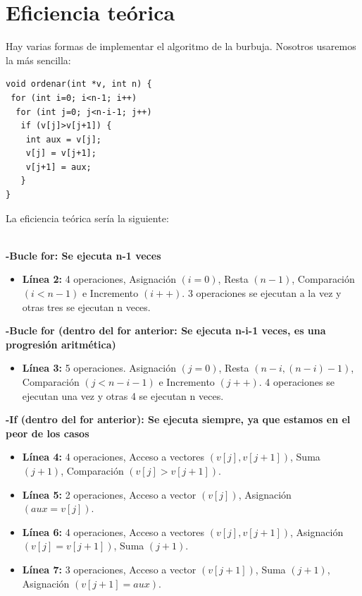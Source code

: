 \documentclass[a4paper,11pt]{article}
\begin{document}
\section{Eficiencia teórica}
Hay varias formas de implementar el algoritmo de la burbuja. Nosotros usaremos la más sencilla:
\lstset{language=C, breaklines=true, basicstyle=\footnotesize}
\begin{lstlisting}[frame=single]
void ordenar(int *v, int n) {
 for (int i=0; i<n-1; i++)
  for (int j=0; j<n-i-1; j++)
   if (v[j]>v[j+1]) {
    int aux = v[j];
    v[j] = v[j+1];
    v[j+1] = aux;
   }
}
\end{lstlisting}
La eficiencia teórica sería la siguiente:\\ \\
\begin{large}
{\bf -Bucle for: Se ejecuta n-1 veces}
\end{large}
\begin{itemize}
\item {\bf Línea 2:} 4 operaciones, Asignación $(i=0)$, Resta $(n-1)$, Comparación $(i<n-1)$ e Incremento $(i++)$. 3 operaciones se ejecutan a la vez y otras tres se ejecutan n veces.
\end{itemize}
\begin{large}
{\bf -Bucle for (dentro del for anterior: Se ejecuta n-i-1 veces, es una progresión aritmética)}
\end{large}
\begin{itemize}
\item {\bf Línea 3:} 5 operaciones. Asignación $(j=0)$, Resta $(n-i,(n-i)-1)$, Comparación $(j<n-i-1)$ e Incremento $(j++)$. 4 operaciones se ejecutan una vez y otras 4 se ejecutan n veces.
\end{itemize}
\begin{large}
{\bf -If (dentro del for anterior): Se ejecuta siempre, ya que estamos en el peor de los casos}
\end{large}
\begin{itemize}
\item {\bf Línea 4:} 4 operaciones, Acceso a vectores $(v[j],v[j+1])$, Suma $(j+1)$, Comparación $(v[j]>v[j+1])$.
\item {\bf Línea 5:} 2 operaciones, Acceso a vector $(v[j])$, Asignación $(aux=v[j])$.
\item {\bf Línea 6:} 4 operaciones, Acceso a vectores $(v[j],v[j+1])$, Asignación $(v[j]=v[j+1])$, Suma $(j+1)$.
\item {\bf Línea 7:} 3 operaciones, Acceso a vector $(v[j+1])$, Suma $(j+1)$, Asignación $(v[j+1]=aux)$. 
\end{itemize}
\end{document}
